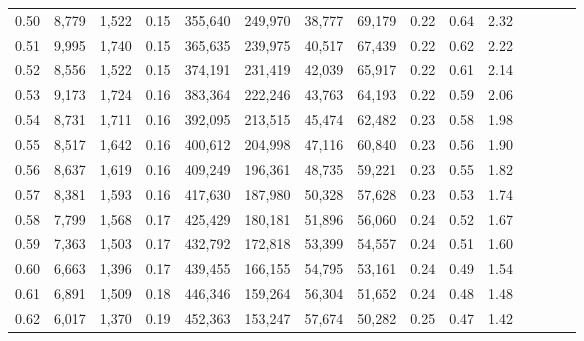 \begin{tabular}{rrrcrrrrrrrrrrr}
0.50 &   8,779 &  1,522 &                                       0.15 &  355,640 &  249,970 &   38,777 &   69,179 &  0.22 &  0.64 &                         2.32 \\
0.51 &   9,995 &  1,740 &                                       0.15 &  365,635 &  239,975 &   40,517 &   67,439 &  0.22 &  0.62 &                         2.22 \\
0.52 &   8,556 &  1,522 &                                       0.15 &  374,191 &  231,419 &   42,039 &   65,917 &  0.22 &  0.61 &                         2.14 \\
0.53 &   9,173 &  1,724 &                                       0.16 &  383,364 &  222,246 &   43,763 &   64,193 &  0.22 &  0.59 &                         2.06 \\
0.54 &   8,731 &  1,711 &                                       0.16 &  392,095 &  213,515 &   45,474 &   62,482 &  0.23 &  0.58 &                         1.98 \\
0.55 &   8,517 &  1,642 &                                       0.16 &  400,612 &  204,998 &   47,116 &   60,840 &  0.23 &  0.56 &                         1.90 \\
0.56 &   8,637 &  1,619 &                                       0.16 &  409,249 &  196,361 &   48,735 &   59,221 &  0.23 &  0.55 &                         1.82 \\
0.57 &   8,381 &  1,593 &                                       0.16 &  417,630 &  187,980 &   50,328 &   57,628 &  0.23 &  0.53 &                         1.74 \\
0.58 &   7,799 &  1,568 &                                       0.17 &  425,429 &  180,181 &   51,896 &   56,060 &  0.24 &  0.52 &                         1.67 \\
0.59 &   7,363 &  1,503 &                                       0.17 &  432,792 &  172,818 &   53,399 &   54,557 &  0.24 &  0.51 &                         1.60 \\
0.60 &   6,663 &  1,396 &                                       0.17 &  439,455 &  166,155 &   54,795 &   53,161 &  0.24 &  0.49 &                         1.54 \\
0.61 &   6,891 &  1,509 &                                       0.18 &  446,346 &  159,264 &   56,304 &   51,652 &  0.24 &  0.48 &                         1.48 \\
0.62 &   6,017 &  1,370 &                                       0.19 &  452,363 &  153,247 &   57,674 &   50,282 &  0.25 &  0.47 &                         1.42 \\

\end{tabular}

